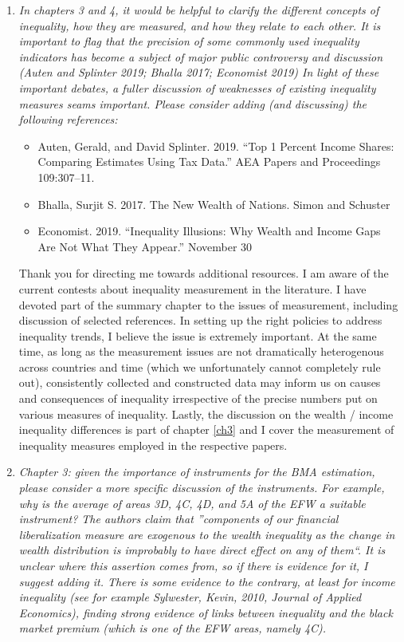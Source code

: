 \begin{enumerate}
    \item \textit{In chapters 3 and 4, it would be helpful to clarify the different concepts of inequality, how they are measured, and how they relate to each other. It is important to flag that the precision of some commonly used inequality indicators has become a subject of major public controversy and discussion (Auten and Splinter 2019; Bhalla 2017; Economist 2019) In light of these important debates, a fuller discussion of weaknesses of existing inequality measures seams important. Please consider adding (and discussing) the following references:}
     \begin{itemize}
        \item Auten, Gerald, and David Splinter. 2019. ``Top 1 Percent Income Shares: Comparing Estimates Using Tax Data.'' AEA Papers and Proceedings 109:307–11.
        \item Bhalla, Surjit S. 2017. The New Wealth of Nations. Simon and Schuster
        \item Economist. 2019. ``Inequality Illusions: Why Wealth and Income Gaps Are Not What They Appear.'' November 30
      \end{itemize}
    
    Thank you for directing me towards additional resources. I am aware of the current contests about inequality measurement in the literature. I have devoted part of the summary chapter to the issues of measurement, including discussion of selected references. In setting up the right policies to address inequality trends, I believe the issue is extremely important. At the same time, as long as the measurement issues are not dramatically heterogenous across countries and time (which we unfortunately cannot completely rule out), consistently collected and constructed data may inform us on causes and consequences of inequality irrespective of the precise numbers put on various measures of inequality. Lastly, the discussion on the wealth / income inequality differences is part of chapter \ref{ch3} and I cover the measurement of inequality measures employed in the respective papers. 

    \item \textit{Chapter 3: given the importance of instruments for the BMA estimation, please consider a more specific discussion of the instruments. For example, why is the average of areas 3D, 4C, 4D, and 5A of the EFW a suitable instrument? The authors claim that ''components of our financial liberalization measure are exogenous to the wealth inequality as the change in wealth distribution is improbably to have direct effect on any of them``. It is unclear where this assertion comes from, so if there is evidence for it, I suggest adding it. There is some evidence to the contrary, at least for income inequality (see for example Sylwester, Kevin, 2010, Journal of Applied Economics), finding strong evidence of links between inequality and the black market premium (which is one of the EFW areas, namely 4C).}
    

\end{enumerate}
